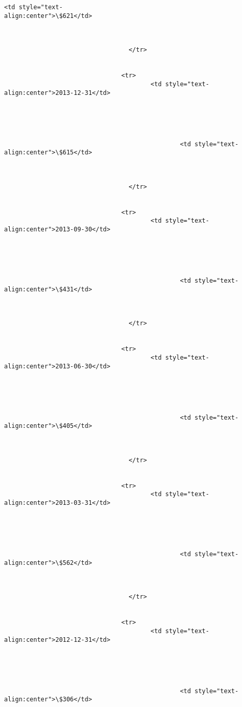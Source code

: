 \documentclass[11pt]{article}
\begin{document}
\begin{Verbatim}[commandchars=\\\{\}]
                                                <td style="text-
align:center">\$621</td>



                                  </tr>


                                <tr>
                                        <td style="text-
align:center">2013-12-31</td>





                                                <td style="text-
align:center">\$615</td>



                                  </tr>


                                <tr>
                                        <td style="text-
align:center">2013-09-30</td>





                                                <td style="text-
align:center">\$431</td>



                                  </tr>


                                <tr>
                                        <td style="text-
align:center">2013-06-30</td>





                                                <td style="text-
align:center">\$405</td>



                                  </tr>


                                <tr>
                                        <td style="text-
align:center">2013-03-31</td>





                                                <td style="text-
align:center">\$562</td>



                                  </tr>


                                <tr>
                                        <td style="text-
align:center">2012-12-31</td>





                                                <td style="text-
align:center">\$306</td>




\end{Verbatim}
\end{document}
